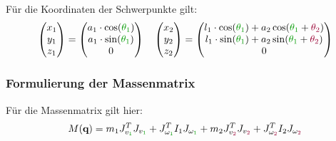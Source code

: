 \documentclass[a4paper, 12pt]{scrartcl}
\newcommand{\gruen}[2][gruen]{\textcolor{#1}{#2}}
\newcommand{\dunkelrot}[2][dunkelrot]{\textcolor{#1}{#2}}
\begin{document}
Für die Koordinaten der Schwerpunkte gilt:
\begin{align*}
    \begin{pmatrix}
        x_1 \\
        y_1 \\
        z_1
    \end{pmatrix}
    =
    \begin{pmatrix}
        a_1 \cdot \cos(\gruen{\theta_1}) \\
        a_1 \cdot \sin(\gruen{\theta_1}) \\
        0
    \end{pmatrix}
    \quad
    \begin{pmatrix}
        x_2 \\
        y_2 \\  
        z_2
    \end{pmatrix}
    =
    \begin{pmatrix}
        l_1 \cdot \cos(\gruen{\theta_1}) 
        + a_2 \cos(\gruen{\theta_1} + \dunkelrot{\theta_2}) \\
        l_1 \cdot \sin(\gruen{\theta_1}) 
        + a_2 \sin(\gruen{\theta_1} + \dunkelrot{\theta_2}) \\
        0
    \end{pmatrix}
\end{align*}

\subsubsection{Formulierung der Massenmatrix}

Für die Massenmatrix gilt hier:
\begin{align*}
    M(\textbf{q}) 
    = m_1 J_{v_{\gruen{1}}}^T J_{v_{\gruen{1}}} 
    + J_{\omega_{\gruen{1}}}^T I_1 J_{\omega_{\gruen{1}}}  
    + m_2 J_{v_{\dunkelrot{2}}}^T J_{v_{\dunkelrot{2}}} 
    + J_{\omega_{\dunkelrot{2}}}^T I_2 J_{\omega_{\dunkelrot{2}}} 
\end{align*}
\end{document}
